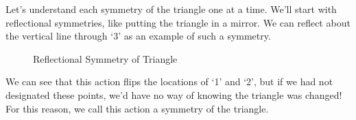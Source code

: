 Let's understand each symmetry of the triangle one at a time. We'll start with reflectional symmetries, like putting the triangle in a mirror. We can reflect about the vertical line through `3' as an example of such a symmetry.
\begin{figure}[H]
    \centering
    


    \caption{Reflectional Symmetry of Triangle}
    \label{fig:triangle reflect}
\end{figure}
We can see that this action flips the locations of `1' and `2', but if we had not designated these points, we'd have no way of knowing the triangle was changed! For this reason, we call this action a symmetry of the triangle.

